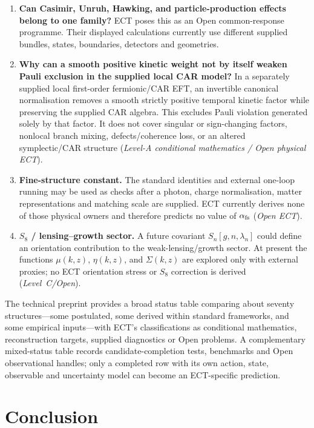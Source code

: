 \documentclass[11pt,a4paper]{article}
\begin{document}
\begin{enumerate}
\item \textbf{Can Casimir, Unruh, Hawking, and particle-production effects belong to one family?} ECT poses this as an Open common-response programme.  Their displayed calculations currently use different supplied bundles, states, boundaries, detectors and geometries.

\item \textbf{Why can a smooth positive kinetic weight not by itself weaken
Pauli exclusion in the supplied local CAR model?} In a separately supplied
local first-order fermionic/CAR EFT, an invertible canonical normalisation
removes a smooth strictly positive temporal kinetic factor while preserving
the supplied CAR algebra.  This excludes Pauli violation generated solely by
that factor.  It does not cover singular or sign-changing factors, nonlocal
branch mixing, defects/coherence loss, or an altered symplectic/CAR structure
(\emph{Level-A conditional mathematics / Open physical ECT}).

\item \textbf{Fine-structure constant.} The standard identities and external
one-loop running may be used as checks after a photon, charge normalisation,
matter representations and matching scale are supplied.  ECT currently
derives none of those physical owners and therefore predicts no value of
$\alpha_{\rm fs}$ (\emph{Open ECT}).

\item \textbf{$S_8$ / lensing--growth sector.}
A future covariant $S_n[g,n,\lambda_n]$ could define an orientation
contribution to the weak-lensing/growth sector.  At present the functions
$\mu(k,z)$, $\eta(k,z)$, and $\Sigma(k,z)$ are explored only with external
proxies; no ECT orientation stress or $S_8$ correction is derived
(\emph{Level~C/Open}).
\end{enumerate}

The technical preprint provides a broad status table comparing about seventy
structures---some postulated, some derived within standard frameworks, and
some empirical inputs---with ECT's classifications as conditional
mathematics, reconstruction targets, supplied diagnostics or Open problems.
A complementary mixed-status table records candidate-completion tests,
benchmarks and Open observational handles; only a completed row with its own
action, state, observable and uncertainty model can become an ECT-specific
prediction.


\section{Conclusion}
\end{document}
